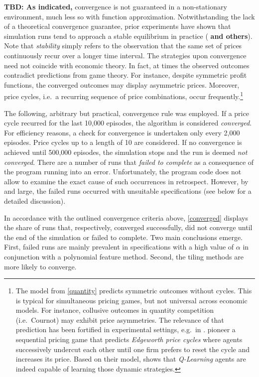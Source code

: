 \textbf{TBD: As indicated,} convergence is not guaranteed in a non-stationary environment, much less so with function approximation. Notwithstanding the lack of a theoretical convergence guarantee, prior experiments have shown that simulation runs tend to approach a stable equilibrium in practice (\cite{calvano_artificial_2019} \textbf{and others}). Note that \emph{stability} simply refers to the observation that the same set of prices continuously recur over a longer time interval. The strategies upon convergence need not coincide with economic theory. In fact, at times the observed outcomes contradict predictions from game theory. For instance, despite symmetric profit functions, the converged outcomes may display asymmetric prices. Moreover, price cycles, i.e.\ a recurring sequence of price combinations, occur frequently.\footnote{The model from \autoref{quantity} predicts symmetric outcomes without cycles. This is typical for simultaneous pricing games, but not universal across economic models. For instance, collusive outcomes in quantity competition (i.e.\ Cournot) may exhibit price asymmetries. The relevance of that prediction has been fortified in experimental settings, e.g.\ in \textcite{fischer_collusion_2019}. \textcite{maskine-tirole} pioneer a sequential pricing game that predicts \emph{Edgeworth price cycles} where agents successively undercut each other until one firm prefers to reset the cycle and increases its price. Based on their model, \textcite{klein_autonomous_2019} shows that \emph{Q-Learning} agents are indeed capable of learning those dynamic strategies.}


The following, arbitrary but practical, convergence rule was employed. If a price cycle recurred for the last 10,000 episodes, the algorithm is considered \emph{converged}. For efficiency reasons, a check for convergence is undertaken only every 2,000 episodes. Price cycles up to a length of 10 are considered. If no convergence is achieved until 500,000 episodes, the simulation stops and the run is deemed \emph{not converged}. There are a number of runs that \emph{failed to complete} as a consequence of the program running into an error. Unfortunately, the program code does not allow to examine the exact cause of such occurrences in retrospect. However, by and large, the failed runs occurred with unsuitable specifications (see below for a detailed discussion).

In accordance with the outlined convergence criteria above, \autoref{converged} displays the share of runs that, respectively, converged successfully, did not converge until the end of the simulation or failed to complete. Two main conclusions emerge. First, failed runs are mainly prevalent in specifications with a high value of $\alpha$ in conjunction with a polynomial feature method. Second, the tiling methods are more likely to converge.

